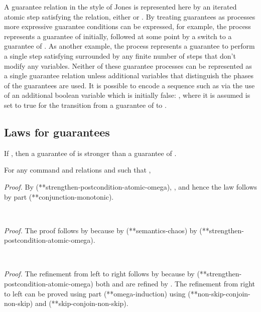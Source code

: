 \documentclass[fleqn]{fac}
\makeatletter
\renewenvironment{proof}{\noindent \textit{Proof.}}{\noindent\par}
\def\refproperty{\@ifnextchar*{\@refproperty}{\@@refproperty}}
\def\@refproperty*#1{\ref{property-#1}\index{Property!#1|LawUse}}
\def\@@refproperty#1{property~(\ref{property-#1})\index{Property!#1|LawUse}}
\makeatother
\begin{document}
\begin{definitionx}[iteration]
\begin{lemmax}[induction]
A guarantee relation  in the style of Jones is represented here by 
an iterated atomic step satisfying the relation, either  or .
By treating guarantees as processes more expressive guarantee conditions can
be expressed, for example, the process 
represents a guarantee of  initially, followed at some point by a switch to a guarantee of .
As another example, the process 
represents a guarantee to perform a single step satisfying  surrounded by any finite number of
steps that don't modify any variables.
Neither of these guarantee processes can be represented as a single guarantee relation
unless additional variables that distinguish the phases of the guarantees are used.
It is possible to encode a sequence such as 
via the use of an additional boolean variable  which is initially false:
,
where it is assumed  is set to true for the transition from a guarantee of  to .


\subsection{Laws for guarantees}\label{section:guarantee-laws}

If , then a guarantee of  is stronger than a guarantee of .
\begin{lawx}
For any command  and relations  and 
such that ,

\end{lawx}

\begin{proof}
By (\refproperty*{strengthen-postcondition-atomic-omega}), 
,
and hence the law follows by  part (\refproperty*{conjunction-monotonic}).
\end{proof}

\begin{lawx}~~~

\end{lawx}
\begin{proof}
The proof follows by  because by (\refproperty*{semantics-chaos})
 by (\refproperty*{strengthen-postcondition-atomic-omega}).
\end{proof}



\begin{lawx}~~~

\end{lawx}

\begin{proof}
The refinement from left to right follows 
by  because by (\refproperty*{strengthen-postcondition-atomic-omega})
both  and  are refined by .
The refinement  from right to left can be proved using  part (\refproperty*{omega-induction})
using (\refproperty*{non-skip-conjoin-non-skip}) and (\refproperty*{skip-conjoin-non-skip}).
\end{proof}


\end{lemmax}
\end{definitionx}
\end{document}
